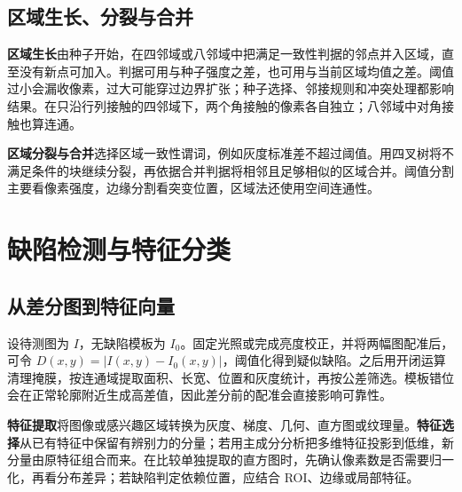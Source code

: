 
\subsection{区域生长、分裂与合并}

\textbf{区域生长}由种子开始，在四邻域或八邻域中把满足一致性判据的邻点并入区域，直至没有新点可加入。判据可用与种子强度之差，也可用与当前区域均值之差。阈值过小会漏收像素，过大可能穿过边界扩张；种子选择、邻接规则和冲突处理都影响结果。在只沿行列接触的四邻域下，两个角接触的像素各自独立；八邻域中对角接触也算连通。

\textbf{区域分裂与合并}选择区域一致性谓词，例如灰度标准差不超过阈值。用四叉树将不满足条件的块继续分裂，再依据合并判据将相邻且足够相似的区域合并。阈值分割主要看像素强度，边缘分割看突变位置，区域法还使用空间连通性。

\section{缺陷检测与特征分类}

\subsection{从差分图到特征向量}

设待测图为 $I$，无缺陷模板为 $I_0$。固定光照或完成亮度校正，并将两幅图配准后，可令 $D(x,y)=|I(x,y)-I_0(x,y)|$，阈值化得到疑似缺陷。之后用开闭运算清理掩膜，按连通域提取面积、长宽、位置和灰度统计，再按公差筛选。模板错位会在正常轮廓附近生成高差值，因此差分前的配准会直接影响可靠性。

\textbf{特征提取}将图像或感兴趣区域转换为灰度、梯度、几何、直方图或纹理量。\textbf{特征选择}从已有特征中保留有辨别力的分量；若用主成分分析把多维特征投影到低维，新分量由原特征组合而来。在比较单独提取的直方图时，先确认像素数是否需要归一化，再看分布差异；若缺陷判定依赖位置，应结合 ROI、边缘或局部特征。


